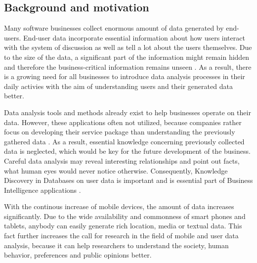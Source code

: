 \subsection{Background and motivation}
	Many software businesses collect enormous amount of data generated by end-users. End-user data incorporate essential information about how users interact with the system of discussion as well as tell a lot about the users themselves. Due to the size of the data, a significant part of the information might remain hidden and therefore the business-critical information remains unseen \cite{inmon2007tapping, wegener2010integrating, introtodatamining}. As a result, there is a growing need for all businesses to introduce data analysis processes in their daily activies with the aim of understanding users and their generated data better.  
	
	Data analysis tools and methods already exist to help businesses operate on their data. However, these applications often not utilized, because companies rather focus on developing their service package than understanding the previously gathered data \cite{inmon2007tapping}. As a result, essential knowledge concerning previously collected data is neglected, which would be key for the future development of the business. Careful data analysis may reveal interesting relationships and point out facts, what human eyes would never notice otherwise. Consequently, Knowledge Discovery in Databases on user data is important and is essential part of Business Intelligence applications \cite{zarsky2002mine}. 

    With the continous increase of mobile devices, the amount of data increases significantly. Due to the wide availability and commonness of smart phones and tablets, anybody can easily generate rich location, media or textual data. This fact further increases the call for research in the field of mobile and user data analysis, because it can help researchers to understand the society, human behavior, preferences and public opinions better.

